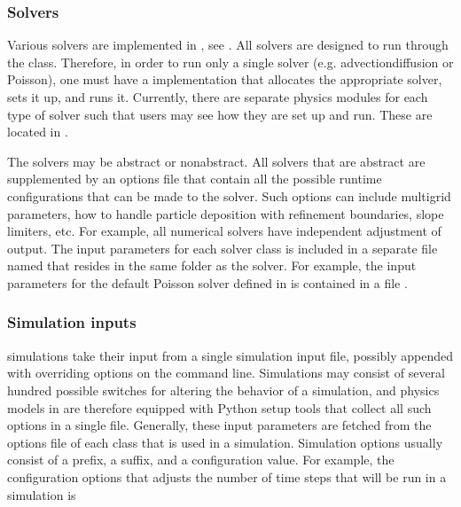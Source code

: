 \documentclass[letterpaper,10pt,english]{sphinxmanual}
\begin{document}
\subsubsection{Solvers}
\label{\detokenize{Model:solvers}}
Various solvers are implemented in , see {\hyperref[\detokenize{index:chap-supportedsolvers}]{}}.
All solvers are designed to run through the  class.
Therefore, in order to run only a single solver (e.g. advection\sphinxhyphen{}diffusion or Poisson), one must have a  implementation that allocates the appropriate solver, sets it up, and runs it.
Currently, there are separate physics modules for each type of solver such that users may see how they are set up and run.
These are located in .

The solvers may be abstract or non\sphinxhyphen{}abstract.
All solvers that are  abstract are supplemented by an options file that contain all the possible run\sphinxhyphen{}time configurations that can be made to the solver.
Such options can include multigrid parameters, how to handle particle deposition with refinement boundaries, slope limiters, etc.
For example, all numerical solvers have independent adjustment of output.
The input parameters for each solver class is included in a separate file named  that resides in the same folder as the solver.
For example, the input parameters for the default Poisson solver defined in  is contained in a file .


\subsubsection{Simulation inputs}
\label{\detokenize{Model:simulation-inputs}}
 simulations take their input from a single simulation input file, possibly appended with overriding options on the command line.
Simulations may consist of several hundred possible switches for altering the behavior of a simulation, and physics models in  are therefore equipped with Python setup tools that collect all such options in a single file.
Generally, these input parameters are fetched from the options file of each class that is used in a simulation.
Simulation options usually consist of a prefix, a suffix, and a configuration value.
For example, the configuration options that adjusts the number of time steps that will be run in a simulation is
\end{document}
